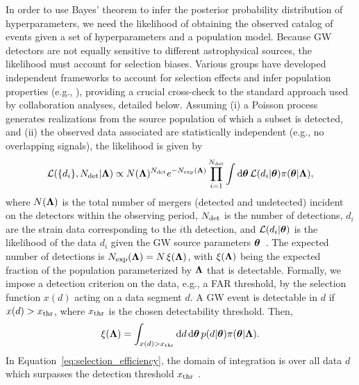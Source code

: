 In order to use Bayes' theorem to infer the posterior probability distribution of hyperparameters, we need the likelihood of obtaining the observed catalog of events given a set of hyperparameters and a population model. 
Because \ac{GW} detectors are not equally sensitive to different astrophysical sources, the likelihood must account for selection biases. Various groups have developed independent frameworks to account for selection effects and infer population properties (e.g., \citet{Roulet:2021hcu,Wysocki:2018mpo}), providing a crucial cross-check to the standard approach used by collaboration analyses, detailed below.
Assuming (i) a Poisson process generates realizations from the source population of which a subset is detected, and (ii) the observed data associated are statistically independent (e.g., no overlapping signals), the likelihood is given by~\citep{Loredo:2004nn, Hogg:2010ma, Farr:2013yna, Mandel:2018mve, Thrane:2018qnx, Taylor:2018iat, Vitale:2020aaz}
\begin{equation}
    \mathcal{L}(\{d_i\},N_{\rm det}|\boldsymbol{\Lambda}) \propto N(\boldsymbol{\Lambda})^{N_{\rm det}} e^{-N_{\rm exp}(\boldsymbol{\Lambda})} \prod_{i=1}^{N_{\rm det}}\int \mathrm{d}\boldsymbol{\theta} \, \mathcal{L}(d_i|\boldsymbol{\theta})\pi(\boldsymbol{\theta}|\boldsymbol{\Lambda}),
    \label{eq:hierarchical_likelihood}
\end{equation}
where $N(\boldsymbol{\Lambda})$ is the total number of mergers (detected and undetected) incident on the detectors within the observing period, $N_{\rm det}$ is the number of detections, $d_i$ are the strain data corresponding to the $i$th detection, and $\mathcal{L}(d_i|\boldsymbol{\theta})$ is the likelihood of the data $d_i$ given the \ac{GW} source parameters $\boldsymbol{\theta}$~\citep{GWTC:Methods}. 
The expected number of detections is $N_{\rm exp}(\boldsymbol{\Lambda}) = N\,\xi(\boldsymbol{\Lambda})$, with $\xi(\boldsymbol{\Lambda})$ being the expected fraction of the population parameterized by $\boldsymbol{\Lambda}$ that is detectable. Formally, we impose a detection criterion on the data, e.g., a \ac{FAR} threshold, by the selection function $x(d)$ acting on a data segment $d$.
A \ac{GW} event is detectable in $d$ if $x(d) > x_{\rm thr}$, where $x_{\rm thr}$ is the chosen detectability threshold. Then,
\begin{equation}
    \xi(\boldsymbol{\Lambda}) = \int_{x(d) > x_{\rm thr}} \mathrm{d}d\, \mathrm{d}\boldsymbol{\theta} \, p(d|\boldsymbol{\theta})\pi(\boldsymbol{\theta}|\boldsymbol{\Lambda}) .
    \label{eq:selection_efficiency}
\end{equation}
In Equation~\eqref{eq:selection_efficiency}, the domain of integration is over all data $d$ which surpasses the detection threshold $x_{\rm thr}$ \citep{Essick:2025zed}.
